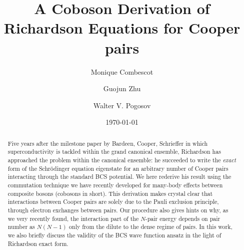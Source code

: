 \documentclass[aps,prb,superscriptaddress,twocolumn]{revtex4}
\begin{document}
\title{A Coboson Derivation of Richardson Equations for Cooper pairs}
\author{Monique Combescot}
\author{Guojun Zhu}
\author{Walter V. Pogosov}
\date{\today}

\begin{abstract}
Five years after the milestone paper by Bardeen, Cooper, Schrieffer in which
superconductivity is tackled within the grand canonical ensemble, Richardson
has approached the problem within the canonical ensemble: he succeeded to
write the \textit{exact} form of the Schr\"{o}dinger equation eigenstate for
an arbitrary number of Cooper pairs interacting through the standard BCS
potential. We here rederive his result using the commutation technique we
have recently developed for many-body effects between composite bosons
(cobosons in short). This derivation makes crystal clear that interactions
between Cooper pairs are solely due to the Pauli exclusion principle,
through electron exchanges between pairs. Our procedure also gives hints on
why, as we very recently found, the interaction part of the $N$-pair energy
depends on pair number as $N(N-1)$ only from the dilute to the dense regime
of pairs. In this work, we also briefly discuss the validity of the BCS wave
function ansatz in the light of Richardson exact form.
\end{abstract}

\pacs{}
\maketitle


\end{document}
